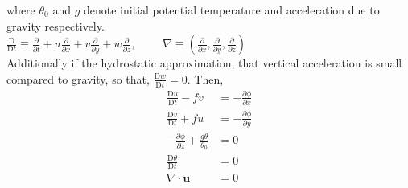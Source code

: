 where $\theta_0$ and $g$ denote initial potential temperature and acceleration due to gravity respectively. \\
$\frac{\mathrm{D}}{\mathrm{D}t} \equiv \frac{\partial}{\partial t} + u\frac{\partial}{\partial x} + v\frac{\partial}{\partial y} + w\frac{\partial}{\partial z},\qquad$ 
$\nabla \equiv \left(\frac{\partial}{\partial x}, \frac{\partial}{\partial y},\frac{\partial}{\partial z}\right)$ \\
\linebreak
Additionally if the hydrostatic approximation, that vertical acceleration is small compared to gravity, so that, $\frac{\mathrm{D}w}{\mathrm{D}t} = 0$. Then, 
\begin{equation}
	\begin{aligned}
	\frac{\mathrm{D}u}{\mathrm{D}t}	- fv  &= -\frac{\partial \phi}{\partial x}\\
	\frac{\mathrm{D}v}{\mathrm{D}t}	+ fu  &= -\frac{\partial \phi}{\partial y}\\
	-\frac{\partial \phi}{\partial z} + \frac{g\theta}{\theta_0} &= 0\\
	\frac{\mathrm{D} \theta}{\mathrm{D}t} &= 0\\
	\nabla \cdot \bm{u} &= 0
	\end{aligned}
	\label{3DBousPThydro}
\end{equation}
